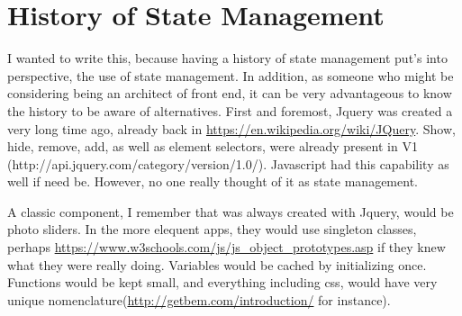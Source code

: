 \maketitle{}
\section{ History of State Management }

I wanted to write this, because having a history of state management put's into
perspective, the use of state management. In addition, as someone who might be
considering being an architect of front end, it can be very advantageous to
know the history to be aware of alternatives. First and foremost, Jquery was
created a very long time ago, already back in \href{2006}{https://en.wikipedia.org/wiki/JQuery}.
Show, hide, remove, add, as well as element selectors, were already present in
V1 (http://api.jquery.com/category/version/1.0/). Javascript had this capability
as well if need be. However, no one really thought of it as state management.

A classic component, I remember that was always created with Jquery, would be
photo sliders. In the more elequent apps, they would use singleton classes,
perhaps \href{prototypes}{https://www.w3schools.com/js/js\_object\_prototypes.asp}
if they knew what they were really doing. Variables would be cached by
initializing once. Functions would be kept small, and everything including css,
would have very unique nomenclature(\href{BEMCSS}{http://getbem.com/introduction/}
for instance).
